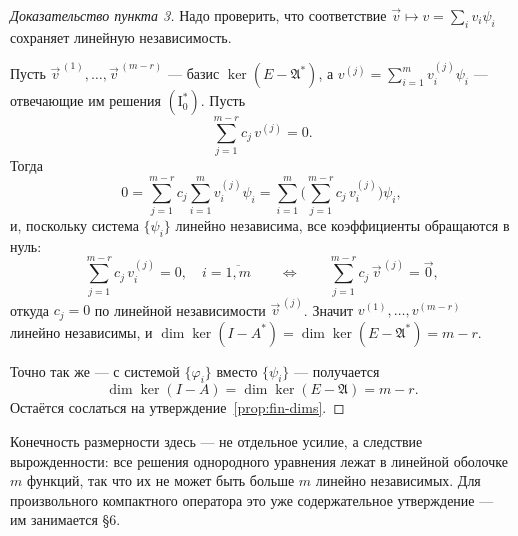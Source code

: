 \begin{proof}[Доказательство пункта 3]
Надо проверить, что соответствие $\vec v \mapsto v = \sum_i v_i \psi_i$
сохраняет линейную независимость.

\medskip
Пусть $\vec v^{\,(1)}, \dots, \vec v^{\,(m-r)}$ — базис
$\ker(E - \mathfrak{A}^*)$, а $v^{(j)} = \sum_{i=1}^{m} v_i^{(j)} \psi_i$ —
отвечающие им решения $(\mathrm{I}_0^*)$. Пусть
\[
  \sum_{j=1}^{m-r} c_j\, v^{(j)} = 0 .
\]
Тогда
\[
  0 = \sum_{j=1}^{m-r} c_j \sum_{i=1}^{m} v_i^{(j)} \psi_i
    = \sum_{i=1}^{m} \Bigg( \sum_{j=1}^{m-r} c_j\, v_i^{(j)} \Bigg) \psi_i ,
\]
и, поскольку система $\{\psi_i\}$ линейно независима, все коэффициенты
обращаются в нуль:
\[
  \sum_{j=1}^{m-r} c_j\, v_i^{(j)} = 0, \quad i = \overline{1,m}
  \qquad\Longleftrightarrow\qquad
  \sum_{j=1}^{m-r} c_j\, \vec v^{\,(j)} = \vec 0 ,
\]
откуда $c_j = 0$ по линейной независимости $\vec v^{\,(j)}$. Значит
$v^{(1)},\dots,v^{(m-r)}$ линейно независимы, и
$\dim \ker(I - A^*) = \dim\ker(E - \mathfrak{A}^*) = m - r$.

\medskip
Точно так же — с системой $\{\varphi_i\}$ вместо $\{\psi_i\}$ — получается
\[
  \dim \ker(I - A) = \dim \ker(E - \mathfrak{A}) = m - r .
\]
Остаётся сослаться на утверждение~\ref{prop:fin-dims}.
\end{proof}

\begin{idea}
Конечность размерности здесь — не отдельное усилие, а следствие вырожденности:
все решения однородного уравнения лежат в линейной оболочке $m$ функций, так
что их не может быть больше $m$ линейно независимых. Для произвольного
компактного оператора это уже содержательное утверждение — им занимается
\S6.
\end{idea}

